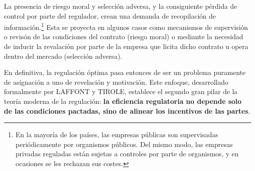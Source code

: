 \documentclass[10pt,a4paper]{article}
\begin{document}
La presencia de riesgo moral y selección adversa, y la consiguiente pérdida de control por parte del regulador, crean una demanda de recopilación de información.\footnote{%
    En la mayoría de los países, las empresas públicas son supervisadas periódicamente por organismos públicos. Del mismo modo, las empresas privadas reguladas están sujetas a controles por parte de organismos, y en ocasiones se les rechazan sus costes.
} Esta se proyecta en algunos casos como mecanismos de supervisión o revisón de las condiciones del contrato (riesgo moral) o mediante la necesidad de inducir la revalación por parte de la empresa que licita dicho contrato u opera dentro del mercado (selección adversa).

En definitiva, la regulación óptima pasa entonces de ser un problema puramente de asignación a uno de revelación y motivación. Este enfoque, desarrollado formalmente por LAFFONT y TIROLE, establece el segundo gran pilar de la teoría moderna de la regulación: \textbf{la eficiencia regulatoria no depende solo de las condiciones pactadas, sino de alinear los incentivos de las partes}.
\end{document}
